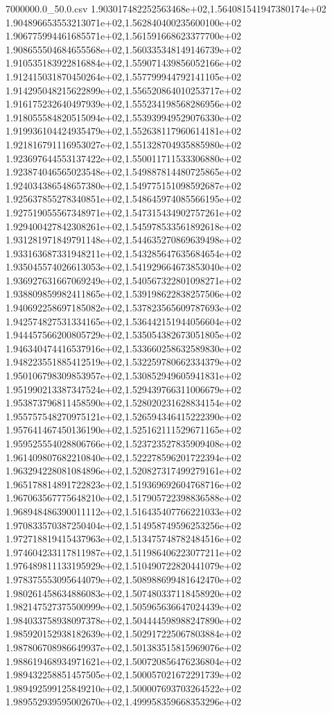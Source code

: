 \begin{filecontents*}{7000000.0_50.0.csv}
1.903017482252563468e+02,1.564081541947380174e+02
1.904896653553213071e+02,1.562840400235600100e+02
1.906775994461685571e+02,1.561591668623377700e+02
1.908655504684655568e+02,1.560335348149146739e+02
1.910535183922816884e+02,1.559071439856052166e+02
1.912415031870450264e+02,1.557799944792141105e+02
1.914295048215622899e+02,1.556520864010253717e+02
1.916175232640497939e+02,1.555234198568286956e+02
1.918055584820515094e+02,1.553939949529076330e+02
1.919936104424935479e+02,1.552638117960614181e+02
1.921816791116953027e+02,1.551328704935885980e+02
1.923697644553137422e+02,1.550011711533306880e+02
1.923874046565023548e+02,1.549887814480725865e+02
1.924034386548657380e+02,1.549775151098592687e+02
1.925637855278340851e+02,1.548645974085566195e+02
1.927519055567348971e+02,1.547315434902757261e+02
1.929400427842308261e+02,1.545978533561892618e+02
1.931281971849791148e+02,1.544635270869639498e+02
1.933163687331948211e+02,1.543285647635684654e+02
1.935045574026613053e+02,1.541929664673853040e+02
1.936927631667069249e+02,1.540567322801098271e+02
1.938809859982411865e+02,1.539198622838257506e+02
1.940692258697185082e+02,1.537823565609787693e+02
1.942574827531334165e+02,1.536442151944056604e+02
1.944457566200805729e+02,1.535054382673051805e+02
1.946340474416537916e+02,1.533660258632589830e+02
1.948223551885412519e+02,1.532259780662334379e+02
1.950106798309853957e+02,1.530852949605941831e+02
1.951990213387347524e+02,1.529439766311006679e+02
1.953873796811458590e+02,1.528020231628834154e+02
1.955757548270975121e+02,1.526594346415222390e+02
1.957641467450136190e+02,1.525162111529671165e+02
1.959525554028806766e+02,1.523723527835909408e+02
1.961409807682210840e+02,1.522278596201722394e+02
1.963294228081084896e+02,1.520827317499279161e+02
1.965178814891722823e+02,1.519369692604768716e+02
1.967063567775648210e+02,1.517905722398836588e+02
1.968948486390011112e+02,1.516435407766221033e+02
1.970833570387250404e+02,1.514958749596253256e+02
1.972718819415437963e+02,1.513475748782484516e+02
1.974604233117811987e+02,1.511986406223077211e+02
1.976489811133195929e+02,1.510490722820441079e+02
1.978375553095644079e+02,1.508988699481642470e+02
1.980261458634886083e+02,1.507480337118458920e+02
1.982147527375500999e+02,1.505965636647024439e+02
1.984033758938097378e+02,1.504444598988247890e+02
1.985920152938182639e+02,1.502917225067803884e+02
1.987806708986649937e+02,1.501383515815969076e+02
1.988619468934971621e+02,1.500720856476236804e+02
1.989432258851457505e+02,1.500057021672291739e+02
1.989492599125849210e+02,1.500007693703264522e+02
1.989552939595002670e+02,1.499958359668353296e+02

\end{filecontents*}
